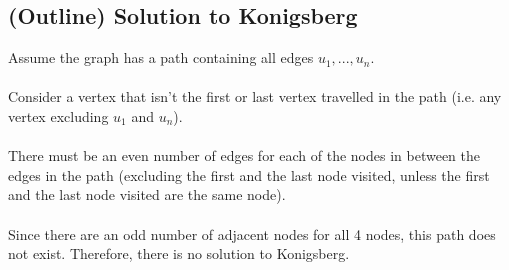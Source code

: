 \documentclass[12pt]{article}
\begin{document}
\subsection{(Outline) Solution to Konigsberg}

Assume the graph has a path containing all edges $u_1,...,u_n$.\\
\\
Consider a vertex that isn't the first or last vertex travelled in the path (i.e. any vertex excluding $u_1$ and $u_n$).\\
\\
There must be an even number of edges for each of the nodes in between the edges in the path (excluding the first and the last node visited, unless the first and the last node visited are the same node).\\
\\
Since there are an odd number of adjacent nodes for all 4 nodes, this path does not exist. Therefore, there is no solution to Konigsberg.
\end{document}
